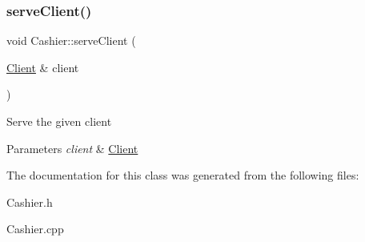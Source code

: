 \subsubsection{\texorpdfstring{serve\+Client()}{serveClient()}}
{\footnotesize\ttfamily void Cashier\+::serve\+Client (\begin{DoxyParamCaption}\item[{\hyperlink{classClient}{Client} \&}]{client }\end{DoxyParamCaption})}

Serve the given client 
\begin{DoxyParams}{Parameters}
{\em client} & \hyperlink{classClient}{Client} \\
\hline
\end{DoxyParams}


The documentation for this class was generated from the following files\+:\begin{DoxyCompactItemize}
\item 
Cashier.\+h\item 
Cashier.\+cpp\end{DoxyCompactItemize}

